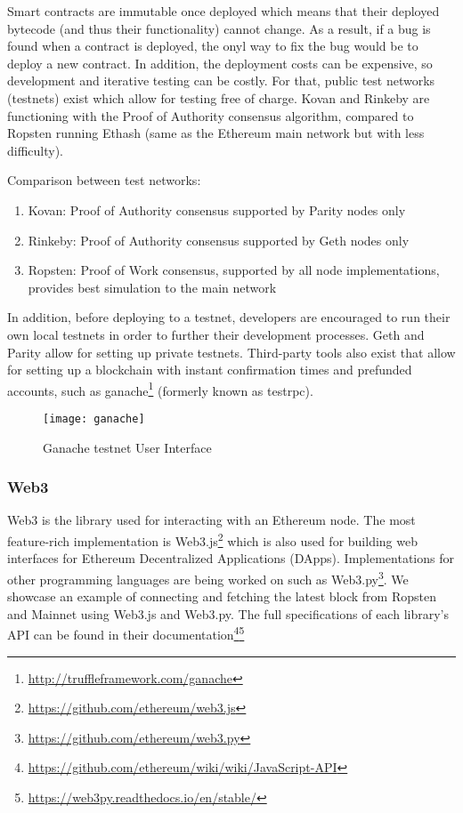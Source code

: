 Smart contracts are immutable once deployed which means that their deployed bytecode (and thus their functionality) cannot change. As a result, if a bug is found when a contract is deployed, the onyl way to fix the bug would be to deploy a new contract. In addition, the deployment costs can be expensive, so development and iterative testing can be costly. For that, public test networks (testnets) exist which allow for testing free of charge. Kovan and Rinkeby are functioning with the Proof of Authority \cite{poa} consensus algorithm, compared to Ropsten running Ethash \cite{ethash} (same as the Ethereum main network but with less difficulty). 

Comparison between test networks:
\begin{enumerate}
    \item Kovan: Proof of Authority consensus supported by Parity nodes only
    \item Rinkeby: Proof of Authority consensus supported by Geth nodes only
    \item Ropsten: Proof of Work consensus, supported by all node implementations, provides best simulation to the main network 
\end{enumerate}

In addition, before deploying to a testnet, developers are encouraged to run their own local testnets in order to further their development processes. Geth and Parity allow for setting up private testnets. Third-party tools also exist that allow for setting up a blockchain with instant confirmation times and prefunded accounts, such as ganache\footnote{\url{http://truffleframework.com/ganache}} (formerly known as testrpc).

\begin{figure}[H]
    \centering
    \texttt{[image: ganache]}
    \caption{Ganache testnet User Interface}
    \label{fig:ganache}
    
\end{figure}

\subsubsection{Web3}
Web3 is the library used for interacting with an Ethereum node. The most feature-rich implementation is Web3.js\footnote{\url{https://github.com/ethereum/web3.js}} which is also used for building web interfaces for Ethereum Decentralized Applications (DApps). Implementations for other programming languages are being worked on such as Web3.py\footnote{\url{https://github.com/ethereum/web3.py}}. We showcase an example of connecting and fetching the latest block from Ropsten and Mainnet using Web3.js and Web3.py. The full specifications of each library's API can be found in their documentation\footnote{\url{https://github.com/ethereum/wiki/wiki/JavaScript-API}}\footnote{\url{https://web3py.readthedocs.io/en/stable/}}


